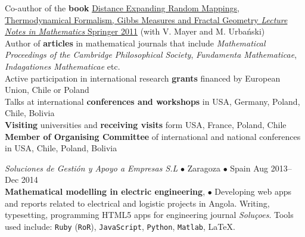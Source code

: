 \documentclass[a4paper, oneside]{scrreprt}
\begin{document}
\noindent\llap{\FA \faBook\ \ }Co-author of the \textbf{book} \href{http://www.amazon.com/Distance-Expanding-Thermodynamical-Formalism-Mathematics/dp/3642236499/ref=sr_1_1?s=books&ie=UTF8&qid=1410309067&sr=1-1}{Distance Expanding Random Mappings, Thermodynamical Formalism, Gibbs Measures and Fractal Geometry \textit{Lecture Notes in Mathematics} Springer 2011} (with V. Mayer and M. Urbański)\\
\noindent\llap{\FA \faPencil\ \ }Author of \textbf{articles} in 
mathematical journals that include  
\textit{Mathematical Proceedings of the Cambridge Philosophical Society}, \textit{Fundamenta Mathematicae}, \textit{Indagationes Mathematicae} etc.\\
\noindent\llap{\FA \faFlask\ \ }Active participation in international research \textbf{grants} financed by European Union, Chile or Poland\\
\noindent\llap{\FA \faBullhorn\ \ }Talks at international 
\textbf{conferences and workshops} in USA, Germany, Poland, 
Chile, Bolivia\\
\noindent\llap{\FA \faExchange\ \ }\textbf{Visiting} 
universities and \textbf{receiving visits} form USA, France, Poland, Chile\\
\noindent\llap{\FA \faCalendar\ \ }\textbf{Member of Organising Committee}
of international and national conferences in USA, Chile, Poland, Bolivia\\

\vspace{-0.3cm}
\noindent\makebox[\linewidth]{\rule{\textwidth}{0.4pt}}

\vspace{0.2cm}



\noindent{}\textit{Soluciones de Gestión y Apoyo a Empresas S.L} 
$\bullet$ Zaragoza $\bullet$ Spain \hfill Aug 2013--Dec 2014\\
\noindent\textbf{\small Mathematical modelling in electric engineering}, $\bullet$ 
{\small Developing web apps and reports related to electrical and
  logistic projects in Angola.  Writing, typesetting, programming
  HTML5 apps for engineering journal \emph{Soluçoes}.  Tools used
  include:
  \texttt{Ruby} (\texttt{RoR}), \texttt{JavaScript}, \texttt{Python}, \texttt{Matlab}, \LaTeX.}\\
\end{document}
